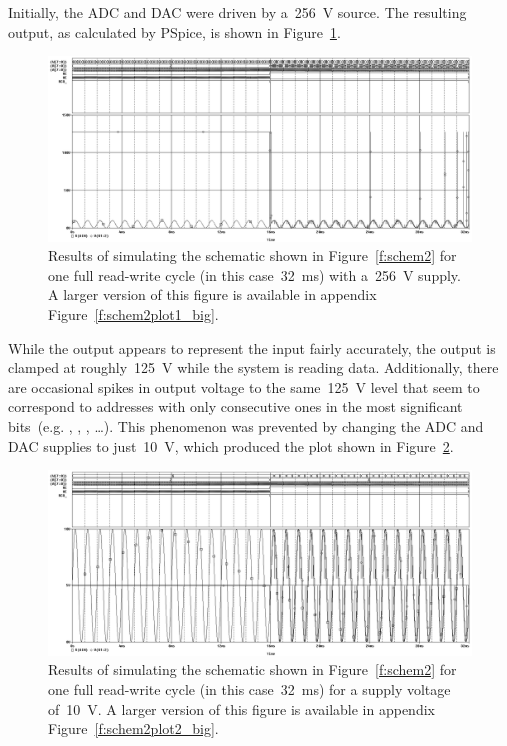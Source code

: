 Initially, the ADC and DAC were driven by a~\SI{256}{\volt} source.  The
resulting output, as calculated by PSpice, is shown in
Figure~\ref{f:schem2plot1}.
%
\begin{figure}[H]
\centering
	\includegraphics[width=.8\textwidth]{img/shot/sim2_plot1.png}
	\parbox{.8\textwidth}{
	\caption[Part 2 Simulation Results 1]{Results of simulating the schematic
	shown in Figure~\ref{f:schem2} for one full read-write cycle (in this
	case~\SI{32}{\milli\second}) with a~\SI{256}{\volt} supply.  A larger
	version of this figure is available in appendix
	Figure~\ref{f:schem2plot1_big}.}
	\label{f:schem2plot1}}
\end{figure}
%
While the output appears to represent the input fairly accurately, the output
is clamped at roughly~\SI{125}{\volt} while the system is reading data.
Additionally, there are occasional spikes in output voltage to the
same~\SI{125}{\volt} level that seem to correspond to addresses with only
consecutive ones in the most significant bits~(e.g. , , , \ldots).  This phenomenon was prevented by changing the
ADC and DAC supplies to just~\SI{10}{\volt}, which produced the plot shown in
Figure~\ref{f:schem2plot2}.
%
\begin{figure}[H]
\centering
	\includegraphics[width=.8\textwidth]{img/shot/sim2_plot2.png}
	\parbox{.8\textwidth}{
	\caption[Part 2 Simulation Results 2]{Results of simulating the schematic
	shown in Figure~\ref{f:schem2} for one full read-write cycle (in this
	case~\SI{32}{\milli\second}) for a supply voltage of~\SI{10}{\volt}.  A
	larger version of this figure is available in appendix
	Figure~\ref{f:schem2plot2_big}.}
	\label{f:schem2plot2}}
\end{figure}
